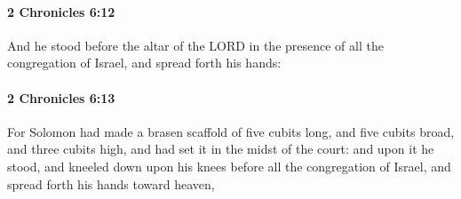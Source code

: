 		\paragraph{2 Chronicles 6:12} %
			\label{2CHRONICLES-6-12}

			And he stood before the altar of the LORD in the presence of all the congregation of Israel, and spread forth his hands:


		\paragraph{2 Chronicles 6:13} %
			\label{2CHRONICLES-6-13}

			For Solomon had made a brasen scaffold of five cubits long, and five cubits broad, and three cubits high, and had set it in the midst of the court: and upon it he stood, and kneeled down upon his knees before all the congregation of Israel, and spread forth his hands toward heaven,

